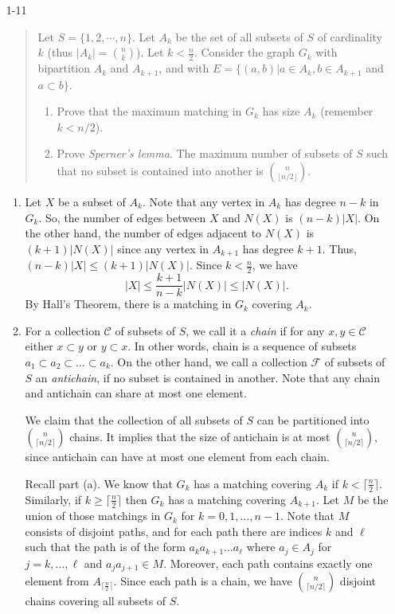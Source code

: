 \documentclass[12pt]{article}
\begin{document}
\begin{enumerate}
\item[1-11] %
\begin{quote}
Let $S=\{1,2, \cdots, n\}$. Let $A_k$ be the set of all subsets of $S$ of cardinality $k$ (thus $|A_k|={n \choose k}$). Let $k<\frac{n}{2}$. Consider the graph $G_k$ with bipartition $A_k$ and $A_{k+1}$, and with $E=\{(a,b) | a\in A_k, b\in A_{k+1}$ and $a\subset b\}$. 
\begin{enumerate}
\item
Prove that the maximum matching in $G_k$ has size $A_k$ (remember $k<n/2$). 
\item
Prove {\it Sperner's lemma}. The maximum number of subsets of $S$ such that no subset is contained into another is ${n \choose {\lfloor n/2 \rfloor}}$.  
\end{enumerate}
\end{quote}

\begin{enumerate}
\item Let $X$ be a subset of $A_k$. Note that any vertex in $A_k$ has degree $n-k$ in $G_k$. So, the number of edges between $X$ and $N(X)$ is $(n-k)|X|$. On the other hand, the number of edges adjacent to $N(X)$ is $(k+1)|N(X)|$ since any vertex in $A_{k+1}$ has degree $k+1$. Thus, $(n-k)|X| \leq (k+1)|N(X)|$. Since $k < \frac{n}{2}$, we have
$$
|X| \leq \frac{k+1}{n-k}|N(X)| \leq |N(X)|.
$$
By Hall's Theorem, there is a matching in $G_k$ covering $A_k$. 

\item For a collection $\mathcal{C}$ of subsets of $S$, we call it a {\it chain} if for any $x, y \in \mathcal{C}$ either $x \subset y$ or $y \subset x$. In other words, chain is a sequence of subsets $a_1 \subset a_2 \subset \dotsc \subset a_k$. On the other hand, we call a collection $\mathcal{F}$ of subsets of $S$ an {\it antichain}, if no subset is contained in another. Note that any chain and antichain can share at most one element. 

We claim that the collection of all subsets of $S$ can be partitioned into $\binom{n}{\lceil n/2 \rceil}$ chains. It implies that the size of antichain is at most $\binom{n}{\lceil n/2 \rceil}$, since antichain can have at most one element from each chain. 

Recall part (a). We know that $G_k$ has a matching covering $A_k$ if $k < \lceil \frac{n}{2} \rceil$. Similarly, if $k \geq \lceil \frac{n}{2} \rceil$ then $G_k$ has a matching covering $A_{k+1}$. Let $M$ be the union of those matchings in $G_k$ for $k=0,1,\dotsc,n-1$. Note that $M$ consists of disjoint paths, and for each path there are indices $k$ and $\ell$ such that the path is of the form $a_k a_{k+1} \dotsc a_\ell$ where $a_j \in A_j$ for $j=k, \dotsc, \ell$ and $a_j a_{j+1} \in M$. Moreover, each path contains exactly one element from $A_{\lceil \frac{n}{2} \rceil}$. Since each path is a chain, we have $\binom{n}{\lceil n/2 \rceil}$ disjoint chains covering all subsets of $S$. 



\end{enumerate}
\end{enumerate}
\end{document}
